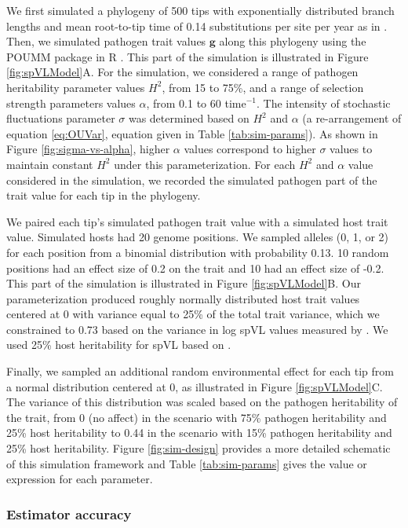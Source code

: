 \documentclass[11pt]{article}
\begin{document}
\begin{linenumbers}
We first simulated a phylogeny of 500 tips with exponentially distributed branch lengths and mean root-to-tip time of 0.14 substitutions per site per year as in \cite{Hodcroft2014}. Then, we simulated pathogen trait values $\bm{g}$ along this phylogeny using the POUMM package in R \citep{Mitov2017a-POUMM}. This part of the simulation is illustrated in Figure \ref{fig:spVLModel}A. For the simulation, we considered a range of pathogen heritability parameter values $H^2$, from 15 to 75\%, and a range of selection strength parameters values $\alpha$, from 0.1 to 60 time$^{-1}$. The intensity of stochastic fluctuations parameter $\sigma$ was determined based on $H^2$ and $\alpha$ (a re-arrangement of equation \ref{eq:OUVar}, equation given in Table \ref{tab:sim-params}). As shown in Figure \ref{fig:sigma-vs-alpha}, higher $\alpha$ values correspond to higher $\sigma$ values to maintain constant $H^2$ under this parameterization. For each $H^2$ and $\alpha$ value considered in the simulation, we recorded the simulated pathogen part of the trait value for each tip in the phylogeny.

We paired each tip's simulated pathogen trait value with a simulated host trait value. Simulated hosts had 20 genome positions. We sampled alleles (0, 1, or 2) for each position from a binomial distribution with probability 0.13. 10 random positions had an effect size of 0.2 on the trait and 10 had an effect size of -0.2. This part of the simulation is illustrated in Figure \ref{fig:spVLModel}B. Our parameterization produced roughly normally distributed host trait values centered at 0 with variance equal to 25\% of the total trait variance, which we constrained to 0.73 based on the variance in log spVL values measured by \cite{Mitov2018}. We used 25\% host heritability for spVL based on \cite{McLaren2015}.

Finally, we sampled an additional random environmental effect for each tip from a normal distribution centered at 0, as illustrated in Figure \ref{fig:spVLModel}C. The variance of this distribution was scaled based on the pathogen heritability of the trait, from 0 (no affect) in the scenario with 75\% pathogen heritability and 25\% host heritability to 0.44 in the scenario with 15\% pathogen heritability and 25\% host heritability. Figure \ref{fig:sim-design} provides a more detailed schematic of this simulation framework and Table \ref{tab:sim-params} gives the value or expression for each parameter.

\subsubsection*{Estimator accuracy}


\end{linenumbers}
\end{document}
